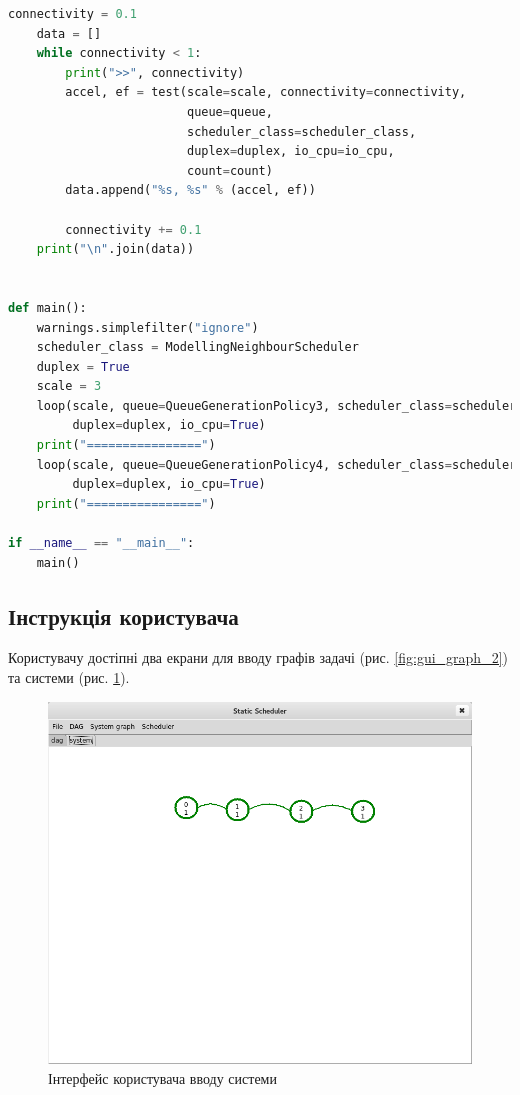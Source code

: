 \begin{lstlisting}[language=Python,caption={Вихідний код скрипта порівняння 3 та 4 черги для алгоритму 6 з 3 лінками},label=lst:test]
    connectivity = 0.1
    data = []
    while connectivity < 1:
        print(">>", connectivity)
        accel, ef = test(scale=scale, connectivity=connectivity,
                         queue=queue,
                         scheduler_class=scheduler_class,
                         duplex=duplex, io_cpu=io_cpu,
                         count=count)
        data.append("%s, %s" % (accel, ef))

        connectivity += 0.1
    print("\n".join(data))


def main():
    warnings.simplefilter("ignore")
    scheduler_class = ModellingNeighbourScheduler
    duplex = True
    scale = 3
    loop(scale, queue=QueueGenerationPolicy3, scheduler_class=scheduler_class,
         duplex=duplex, io_cpu=True)
    print("================")
    loop(scale, queue=QueueGenerationPolicy4, scheduler_class=scheduler_class,
         duplex=duplex, io_cpu=True)
    print("================")

if __name__ == "__main__":
    main()

\end{lstlisting}


\subsection{Інструкція користувача}

Користувачу достіпні два екрани для вводу графів задачі (рис. \ref{fig:gui_graph_2}) та системи (рис. \ref{fig:system_graph_2}).

    \begin{figure}[h!]
      \begin{center}
        \includegraphics[width=\textwidth]{res/system_graph_new.png}
      \end{center}
      \caption{Інтерфейс користувача вводу системи}
    \label{fig:system_graph_2}
    \end{figure}


